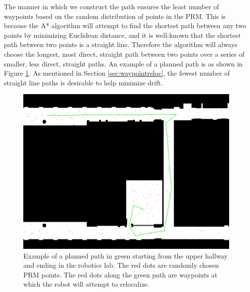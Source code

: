 \documentclass[11pt]{article}
\begin{document}
The manner in which we construct the path ensures the least number of waypoints based on the random distribution of points in the PRM. This is because the A* algorithm will attempt to find the shortest path between any two points by minimizing Euclidean distance, and it is well-known that the shortest path between two points is a straight line. Therefore the algorithm will always choose the longest, most direct, straight path between two points over a series of smaller, less direct, straight paths. An example of a planned path is as shown in Figure \ref{fig:expath}. As mentioned in Section \ref{sec:waypointreloc}, the fewest number of straight line paths is desirable to help minimize drift.

\begin{figure}[H]
\centering
\includegraphics[scale=.4]{img/expath.jpg}
\caption{Example of a planned path in green starting from the upper hallway and ending in the robotics lab. The red dots are randomly chosen PRM points. The red dots along the green path are waypoints at which the robot will attempt to relocalize.}
\label{fig:expath}
\end{figure}
\end{document}
